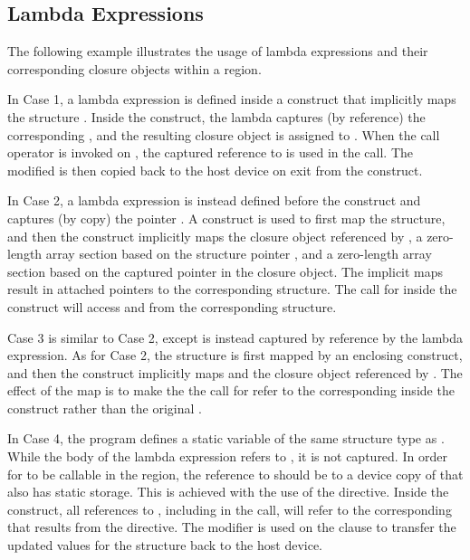 \begin{cppspecific}[4ex]
\section{Lambda Expressions}
\label{sec:lambda_expressions}



The following example illustrates the usage of lambda expressions and their
corresponding closure objects within a  region.

In Case 1, a lambda expression is defined inside a  construct
that implicitly maps the structure . Inside the construct, the
lambda captures (by reference) the corresponding , and the resulting
closure object is assigned to .  When the call operator is
invoked on , the captured reference to  is used in
the call.  The modified  is then copied back to the host device on
exit from the  construct.

In Case 2, a lambda expression is instead defined before the 
construct and captures (by copy) the pointer . A
 construct is used to first map the structure, and
then the  construct implicitly maps the closure object
referenced by , a zero-length array section based on the
structure pointer , and a zero-length array section based on the
captured pointer in the closure object. The implicit maps result in attached
pointers to the corresponding structure. The call for  inside
the  construct will access  and 
from the corresponding structure.

Case 3 is similar to Case 2, except  is instead captured by
reference by the lambda expression. As for Case 2, the structure is first
mapped by an enclosing  construct, and then the
 construct implicitly maps  and the closure object
referenced by . The effect of the map is to make the
the call for  refer to the corresponding  inside the
 construct rather than the original .

In Case 4, the program defines a static variable  of the same
structure type as . While the body of the lambda expression refers
to , it is not captured. In order for  to be
callable in the  region, the reference to  should be
to a device copy of  that also has static storage. This is achieved
with the use of the  directive.  Inside the
 construct, all references to , including in the
 call, will refer to the corresponding  that
results from the  directive. The 
modifier is used on the  clause to transfer the updated values for
the structure back to the host device.

\end{cppspecific}
